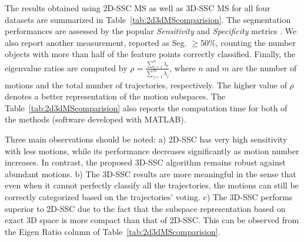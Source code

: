 \documentclass[10pt,twocolumn,letterpaper]{article}  %
\begin{document}
The results obtained using 2D-SSC MS as well as 3D-SSC MS for all four datasets are summarized in Table~\ref{tab:2d3dMScomparision}. The segmentation performances are assessed by the popular \textit{Sensitivity} and \textit{Specificity} metrics \cite{c33}. We also report another measurement, reported as Seg. $\geq 50\% $, counting the number objects with more than half of the feature points correctly classified. Finally, the eigenvalue ratios are computed by $\rho= \frac{\sum_{i=1}^{n}\lambda _i}{\sum_{j=1}^{m}\lambda _j}$, where $n$ and $m$ are the number of motions and the total number of trajectories, respectively. The higher value of $\rho$ denotes a better representation of the motion subspaces. The Table~\ref{tab:2d3dMScomparision} also reports the computation time for both of the methods (software developed with MATLAB).

Three main observations should be noted: a) 2D-SSC has very high sensitivity with less motions, while its performance decreases significantly as motion number increases. In contrast, the proposed 3D-SSC algorithm remains robust against abundant motions. b) The 3D-SSC results are more meaningful in the sense that even when it cannot perfectly classify all the trajectories, the motions can still be correctly categorized based on the trajectories' voting. c) The 3D-SSC performs superior to 2D-SSC due to the fact that the subspace representation based on exact 3D space is more compact than that of 2D-SSC. This can be observed from the Eigen Ratio column of Table~\ref{tab:2d3dMScomparision}.
\\
\end{document}
